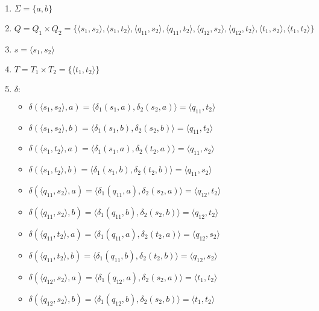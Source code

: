 \documentclass[a4paper, 12pt]{article}
\begin{document}
\begin{enumerate}
    \item $ \Sigma = \{ a, b \} $
    \item $ Q = Q_1 \times Q_2 = \{ \langle s_1, s_2 \rangle, \langle s_1, t_2 \rangle, \langle q_{11}, s_2 \rangle, \langle q_{11}, t_2 \rangle, \langle q_{12}, s_2 \rangle, \langle q_{12}, t_2 \rangle, \langle t_1, s_2 \rangle, \langle t_1, t_2 \rangle \} $
    \item $ s = \langle s_1, s_2 \rangle $
    \item $ T = T_1 \times T_2 = \{ \langle t_1, t_2 \rangle \}$
    \item $ \delta : $
    \begin{itemize}
        \item $ \delta (\langle s_1, s_2 \rangle, a) = \langle \delta_1 (s_1, a), \delta_2 (s_2, a) \rangle = \langle q_{11}, t_2 \rangle $
        \item $ \delta (\langle s_1, s_2 \rangle, b) = \langle \delta_1 (s_1, b), \delta_2 (s_2, b) \rangle = \langle q_{11}, t_2 \rangle $
        
        \item $ \delta (\langle s_1, t_2 \rangle, a) = \langle \delta_1 (s_1, a), \delta_2 (t_2, a) \rangle = \langle q_{11}, s_2 \rangle $
        \item $ \delta (\langle s_1, t_2 \rangle, b) = \langle \delta_1 (s_1, b), \delta_2 (t_2, b) \rangle = \langle q_{11}, s_2 \rangle $
        
        \item $ \delta (\langle q_{11}, s_2 \rangle, a) = \langle \delta_1 (q_{11}, a), \delta_2 (s_2, a) \rangle = \langle q_{12}, t_2 \rangle $
        \item $ \delta (\langle q_{11}, s_2 \rangle, b) = \langle \delta_1 (q_{11}, b), \delta_2 (s_2, b) \rangle = \langle q_{12}, t_2 \rangle $
        
        \item $ \delta (\langle q_{11}, t_2 \rangle, a) = \langle \delta_1 (q_{11}, a), \delta_2 (t_2, a) \rangle = \langle q_{12}, s_2 \rangle $
        \item $ \delta (\langle q_{11}, t_2 \rangle, b) = \langle \delta_1 (q_{11}, b), \delta_2 (t_2, b) \rangle = \langle q_{12}, s_2 \rangle $
        
        \item $ \delta (\langle q_{12}, s_2 \rangle, a) = \langle \delta_1 (q_{12}, a), \delta_2 (s_2, a) \rangle = \langle t_1, t_2 \rangle $
        \item $ \delta (\langle q_{12}, s_2 \rangle, b) = \langle \delta_1 (q_{12}, b), \delta_2 (s_2, b) \rangle = \langle t_1, t_2 \rangle $
        

\end{itemize}
\end{enumerate}
\end{document}
